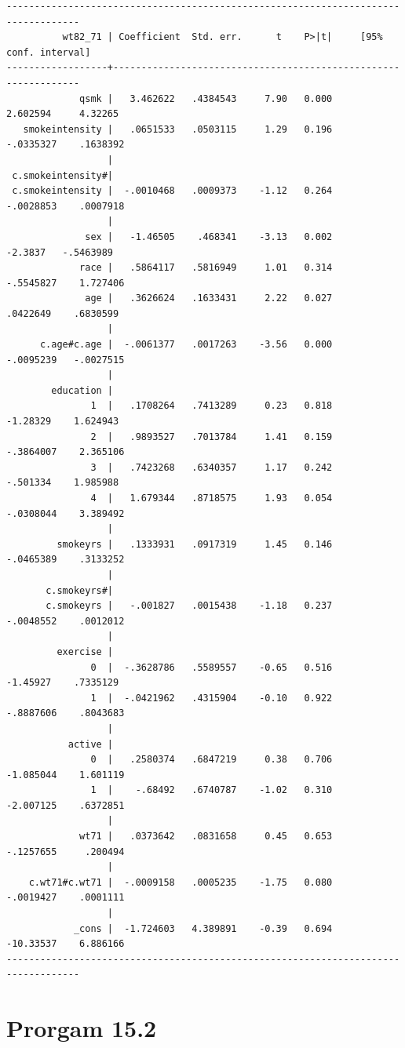 \documentclass[
  10pt,
  a4paper,
]{book}
\begin{document}
\begin{verbatim}
-----------------------------------------------------------------------------------
          wt82_71 | Coefficient  Std. err.      t    P>|t|     [95% conf. interval]
------------------+----------------------------------------------------------------
             qsmk |   3.462622   .4384543     7.90   0.000     2.602594     4.32265
   smokeintensity |   .0651533   .0503115     1.29   0.196    -.0335327    .1638392
                  |
 c.smokeintensity#|
 c.smokeintensity |  -.0010468   .0009373    -1.12   0.264    -.0028853    .0007918
                  |
              sex |   -1.46505    .468341    -3.13   0.002      -2.3837   -.5463989
             race |   .5864117   .5816949     1.01   0.314    -.5545827    1.727406
              age |   .3626624   .1633431     2.22   0.027     .0422649    .6830599
                  |
      c.age#c.age |  -.0061377   .0017263    -3.56   0.000    -.0095239   -.0027515
                  |
        education |
               1  |   .1708264   .7413289     0.23   0.818     -1.28329    1.624943
               2  |   .9893527   .7013784     1.41   0.159    -.3864007    2.365106
               3  |   .7423268   .6340357     1.17   0.242     -.501334    1.985988
               4  |   1.679344   .8718575     1.93   0.054    -.0308044    3.389492
                  |
         smokeyrs |   .1333931   .0917319     1.45   0.146    -.0465389    .3133252
                  |
       c.smokeyrs#|
       c.smokeyrs |   -.001827   .0015438    -1.18   0.237    -.0048552    .0012012
                  |
         exercise |
               0  |  -.3628786   .5589557    -0.65   0.516     -1.45927    .7335129
               1  |  -.0421962   .4315904    -0.10   0.922    -.8887606    .8043683
                  |
           active |
               0  |   .2580374   .6847219     0.38   0.706    -1.085044    1.601119
               1  |    -.68492   .6740787    -1.02   0.310    -2.007125    .6372851
                  |
             wt71 |   .0373642   .0831658     0.45   0.653    -.1257655     .200494
                  |
    c.wt71#c.wt71 |  -.0009158   .0005235    -1.75   0.080    -.0019427    .0001111
                  |
            _cons |  -1.724603   4.389891    -0.39   0.694    -10.33537    6.886166
-----------------------------------------------------------------------------------
\end{verbatim}

\hypertarget{prorgam-15.2}{%
\section{Prorgam 15.2}\label{prorgam-15.2}}
\end{document}
